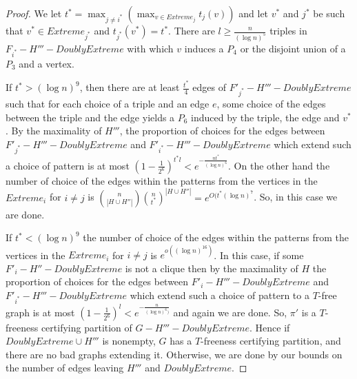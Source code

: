 \documentclass[10pt,a4paper]{amsart}
\begin{document}
\begin{proof}
We let $t^*=\max_{j\neq {i^*}} (\max _{v \in Extreme_j } t_j(v))$ and let $v^*$ and $j^*$ be such that $v^* \in Extreme_{j^*}$ and $t_{j^*}(v^*)=t^*$.
There are   $l \ge \frac{n}{(\log n)^5}$ triples in $F_{i^*}-H'''-DoublyExtreme$ with which $v$ induces a $P_4$ or the disjoint union of a $P_3$ and a vertex.

If $t^* > (\log n)^9$,  then there are at least $\frac{t^*}{4}$ edges of $F'_{j^*}-H'''-DoublyExtreme$ such that for each choice of a triple  and an edge $e$,
some choice of the edges between the triple and the edge yields a $P_6$ induced by the triple, the edge and $v^*$. By the maximality of $H'''$,
the proportion of choices for the edges between   $F'_{j^*}-H'''-DoublyExtreme$ and $F'_{i^*}-H'''-DoublyExtreme$ which extend such a choice of pattern   is at most  $(1-\frac{1}{2^6})^{t^*l}<e^{-\frac{nt^*}{(\log n)^6}}$.
On the other hand the number of choice of the edges  within the patterns from the vertices in the $Extreme_i$ for $i \neq j$ 
is ${n \choose |H  \cup H''|}{n \choose t^*}^{|H \cup H''|}=e^{O(t^*(\log n)^7}$. So, in this case we are done. 

If $t^*<(\log n)^9$ the number of choice of the edges  within the patterns from the vertices in the $Extreme_i$ for $i \neq j$ 
is $e^{o((\log n)^{16})}$. In this case, if  some $F'_i-H''-DoublyExtreme$ is not a clique then by the maximality of $H$ the  proportion of choices for the edges between   $F'_i-H'''-DoublyExtreme$ and $F'_{i^*}-H'''-DoublyExtreme$ which extend such a choice of pattern to a $T$-free graph  is at most  $(1-\frac{1}{2^6})^{l}<e^{-\frac{n}{(\log n)^6)}}$ and again we are done. So,
$\pi'$ is a $T$-freeness certifying partition of $G-H'''-DoublyExtreme$. Hence if $DoublyExtreme \cup H'''$ is nonempty, $G$ has a $T$-freeness certifying partition,
and there are no bad graphs extending it. Otherwise, we are done by our bounds on the number of edges leaving $H'''$ and $DoublyExtreme$. 
\end{proof}
\end{document}
